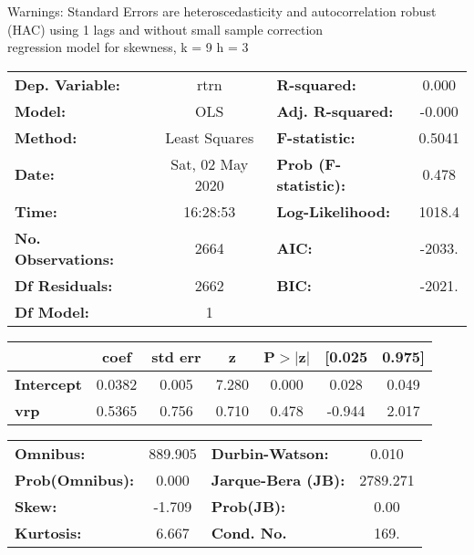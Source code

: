 Warnings: \newline
 [1] Standard Errors are heteroscedasticity and autocorrelation robust (HAC) using 1 lags and without small sample correction\\ 

regression model for skewness, k = 9 h = 3\begin{center}
\begin{tabular}{lclc}
\toprule
\textbf{Dep. Variable:}    &       rtrn       & \textbf{  R-squared:         } &     0.000   \\
\textbf{Model:}            &       OLS        & \textbf{  Adj. R-squared:    } &    -0.000   \\
\textbf{Method:}           &  Least Squares   & \textbf{  F-statistic:       } &    0.5041   \\
\textbf{Date:}             & Sat, 02 May 2020 & \textbf{  Prob (F-statistic):} &    0.478    \\
\textbf{Time:}             &     16:28:53     & \textbf{  Log-Likelihood:    } &    1018.4   \\
\textbf{No. Observations:} &        2664      & \textbf{  AIC:               } &    -2033.   \\
\textbf{Df Residuals:}     &        2662      & \textbf{  BIC:               } &    -2021.   \\
\textbf{Df Model:}         &           1      & \textbf{                     } &             \\
\bottomrule
\end{tabular}
\begin{tabular}{lcccccc}
                   & \textbf{coef} & \textbf{std err} & \textbf{z} & \textbf{P$> |$z$|$} & \textbf{[0.025} & \textbf{0.975]}  \\
\midrule
\textbf{Intercept} &       0.0382  &        0.005     &     7.280  &         0.000        &        0.028    &        0.049     \\
\textbf{vrp}       &       0.5365  &        0.756     &     0.710  &         0.478        &       -0.944    &        2.017     \\
\bottomrule
\end{tabular}
\begin{tabular}{lclc}
\textbf{Omnibus:}       & 889.905 & \textbf{  Durbin-Watson:     } &    0.010  \\
\textbf{Prob(Omnibus):} &   0.000 & \textbf{  Jarque-Bera (JB):  } & 2789.271  \\
\textbf{Skew:}          &  -1.709 & \textbf{  Prob(JB):          } &     0.00  \\
\textbf{Kurtosis:}      &   6.667 & \textbf{  Cond. No.          } &     169.  \\
\bottomrule
\end{tabular}
\end{center}

